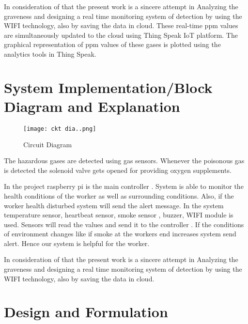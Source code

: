 \documentclass[12pt,a4paper]{report}
\begin{document}
\noindent In consideration of that the present work is a sincere attempt in  Analyzing the graveness and designing a real time monitoring system of detection by using the WIFI technology, also by saving the data in cloud.  These real-time ppm values are simultaneously updated to the cloud using Thing Speak IoT platform. The graphical representation of ppm values of these gases is plotted using the analytics tools in Thing Speak.

\noindent 


\section{ System Implementation/Block Diagram and Explanation}

\noindent 
\begin{figure}[htp]
    \centering
    \texttt{[image: ckt dia..png]}
    \caption{Circuit Diagram}
\end{figure}

\noindent 


\noindent The hazardous gases are detected using gas sensors. Whenever the poisonous gas is detected the solenoid valve gets opened for providing oxygen supplements.

\noindent In the project raspberry pi is the main controller . System is able to monitor the health conditions of the worker as well as surrounding conditions. Also, if the worker health disturbed system will send the alert message. In the system temperature sensor, heartbeat sensor, smoke sensor , buzzer, WIFI module is used. Sensors will read the values and send it to the controller . If the conditions of environment changes like if smoke at the workers end increases system send alert. Hence our system is helpful for the worker.

\noindent In consideration of that the present work is a sincere attempt in  Analyzing the graveness and designing a real time monitoring system of detection by using the WIFI technology, also by saving the data in cloud. 

\noindent 

\noindent 

\noindent 

\noindent 



\noindent               

\noindent 


\section{ Design and Formulation}
\end{document}
